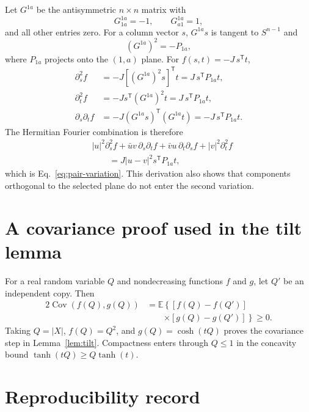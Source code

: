 \documentclass[aps,prb,twocolumn,groupedaddress,amsmath,amssymb,
               superscriptaddress,nofootinbib,floatfix]{revtex4-2}
\theoremstyle{plain}
\theoremstyle{definition}
\newcommand{\Exp}{\mathbb E}
\begin{document}
Let $G^{1a}$ be the antisymmetric $n\times n$ matrix with
\begin{equation}
 G^{1a}_{1a}=-1,\qquad G^{1a}_{a1}=1,
\end{equation}
and all other entries zero.  For a column vector $s$,
$G^{1a}s$ is tangent to $S^{n-1}$ and
\begin{equation}
 (G^{1a})^2=-P_{1a},
\end{equation}
where $P_{1a}$ projects onto the $(1,a)$ plane.  For
$f(s,t)=-J\,s^\mathsf Tt$,
\begin{align}
 \partial_s^2f
 &=-J[(G^{1a})^2s]^\mathsf Tt
 =J\,s^\mathsf TP_{1a}t,\\
 \partial_t^2f
 &=-Js^\mathsf T(G^{1a})^2t
 =J\,s^\mathsf TP_{1a}t,\\
 \partial_s\partial_tf
 &=-J(G^{1a}s)^\mathsf T(G^{1a}t)
 =-J\,s^\mathsf TP_{1a}t.
\end{align}
The Hermitian Fourier combination is therefore
\begin{align}
 &|u|^2\partial_s^2f+\bar uv\,\partial_s\partial_tf
 +\bar vu\,\partial_t\partial_sf+|v|^2\partial_t^2f\nonumber\\
 &\qquad =
 J|u-v|^2s^\mathsf TP_{1a}t,
\end{align}
which is Eq.~\eqref{eq:pair-variation}.  This derivation also shows that
components orthogonal to the selected plane do not enter the second
variation.

\section{A covariance proof used in the tilt lemma}
\label{app:covariance}

For a real random variable $Q$ and nondecreasing functions $f$ and $g$, let
$Q'$ be an independent copy.  Then
\begin{align}
 2\operatorname{Cov}(f(Q),g(Q))
 &=
 \Exp\!\left\{[f(Q)-f(Q')]\right.\nonumber\\
 &\qquad\left.\times[g(Q)-g(Q')]\right\}\ge0.           \label{eq:chebyshev}
\end{align}
Taking $Q=|X|$, $f(Q)=Q^2$, and $g(Q)=\cosh(tQ)$ proves the covariance step
in Lemma~\ref{lem:tilt}.  Compactness enters through $Q\le1$ in the
concavity bound $\tanh(tQ)\ge Q\tanh(t)$.

\section{Reproducibility record}
\label{app:reproducibility}
\end{document}
